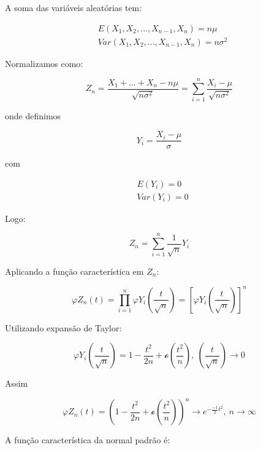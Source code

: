\documentclass{article}
\begin{document}
A soma das variáveis aleatórias tem:

\begin{align*}
    &E(X_1, X_2, ..., X_{n - 1}, X_n) = n\mu \\
    &Var(X_1, X_2, ..., X_{n - 1}, X_n) = n\sigma^2 
\end{align*}

Normalizamos como:

\begin{equation*}
    Z_n = \frac{X_1 + ... + X_n - n\mu}{\sqrt{n\sigma^2}} = \displaystyle \sum_{i = 1}^{n}\frac{X_i - \mu}{\sqrt{n\sigma^2}}
\end{equation*}

onde definimos

\begin{equation*}
    Y_i = \frac{X_i - \mu}{\sigma}
\end{equation*}

com

\begin{align*}
    &E(Y_i) = 0 \\
    &Var(Y_i) = 0
\end{align*}

Logo:

\begin{equation*}
    Z_n = \sum_{i = 1}^{n}\frac{1}{\sqrt{n}}Y_i
\end{equation*}

Aplicando a função característica em $Z_n$:

\begin{equation*}
    \varphi Z_n(t) = \prod_{i = 1}^{n}\varphi Y_i\left(\frac{t}{\sqrt{n}}\right) = \left[\varphi Y_i\left( \frac{t}{\sqrt{n}}\right)\right]^n
\end{equation*}

Utilizando expansão de Taylor:

\begin{equation*}
    \varphi Y_i\left(\frac{t}{\sqrt{n}}\right) = 1 - \frac{t^2}{2n} + \mathcal{o}\left(\frac{t^2}{n}\right), \  \left(\frac{t}{\sqrt{n}}\right) \rightarrow 0
\end{equation*}

Assim

\begin{equation*}
    \varphi Z_n(t) = \left(1 - \frac{t^2}{2n} + \mathcal{o}\left(\frac{t^2}{n}\right)\right)^n \rightarrow e^{-\frac{-1}{2}t^2}, \ n \rightarrow \infty
\end{equation*}

A função característica da normal padrão é:
\end{document}
